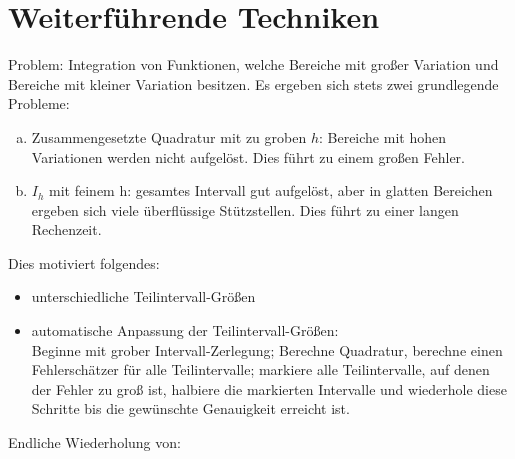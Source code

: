 \documentclass[
]{mycourse}
\begin{document}
\section{Weiterführende Techniken}
\begin{seg}
	Problem: Integration von Funktionen, welche Bereiche mit großer Variation und Bereiche mit kleiner Variation besitzen. Es ergeben sich stets zwei grundlegende Probleme:
	\begin{enumerate}[a)]
		\item Zusammengesetzte Quadratur mit zu groben $h$: Bereiche mit hohen Variationen werden nicht aufgelöst. Dies führt zu einem großen Fehler.
		\item $I_h$ mit feinem h: gesamtes Intervall gut aufgelöst, aber in glatten Bereichen ergeben sich viele überflüssige Stützstellen. Dies führt zu einer langen Rechenzeit.
	\end{enumerate}
\end{seg}
\begin{seg}[Idee:]
	Dies motiviert folgendes:
	\begin{itemize}
		\item unterschiedliche Teilintervall-Größen
		\item automatische Anpassung der Teilintervall-Größen:\\
		 Beginne mit grober Intervall-Zerlegung; Berechne Quadratur, berechne einen Fehlerschätzer für alle Teilintervalle; markiere alle Teilintervalle, auf denen der Fehler zu groß ist, halbiere die markierten Intervalle und wiederhole diese Schritte bis die gewünschte Genauigkeit erreicht ist.
	\end{itemize}
\end{seg}
\begin{seg} 
Endliche Wiederholung von: \\
	\begin{figure}[H]
		  \\
\end{figure}
\end{seg}
\end{document}
